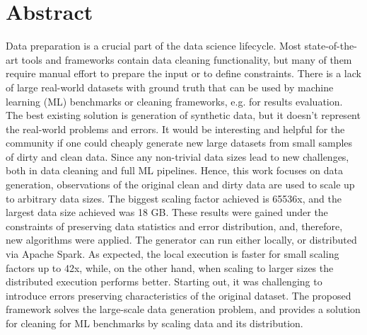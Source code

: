 \chapter*{Abstract}

Data preparation is a crucial part of the data science lifecycle.
Most state-of-the-art tools and frameworks contain data cleaning functionality, 
but many of them require manual effort to prepare the input or to define constraints.
There is a lack of large real-world datasets with ground truth that can be used by machine learning (ML) benchmarks or cleaning frameworks, e.g. for results evaluation.
The best existing solution is generation of synthetic data, but it doesn't represent the real-world problems and errors.
It would be interesting and helpful for the community if one could cheaply generate new large datasets from small samples of dirty and clean data.
Since any non-trivial data sizes lead to new challenges, both in data cleaning and full ML pipelines.
Hence, this work focuses on data generation, observations of the original clean and dirty data are used to scale up to arbitrary data sizes.
The biggest scaling factor achieved is 65536x, and the largest data size achieved was 18 GB.
These results were gained under the constraints of preserving data statistics and error distribution, and, therefore, new algorithms were applied.
The generator can run either locally, or distributed via Apache Spark.
As expected, the local execution is faster for small scaling factors up to 42x, 
while, on the other hand, when scaling to larger sizes the distributed execution performs better.
Starting out, it was challenging to introduce errors preserving characteristics of the original dataset. 
The proposed framework solves the large-scale data generation problem, and provides a solution for cleaning for ML benchmarks by scaling data and its distribution.


\newpage\null\thispagestyle{empty}\newpage
